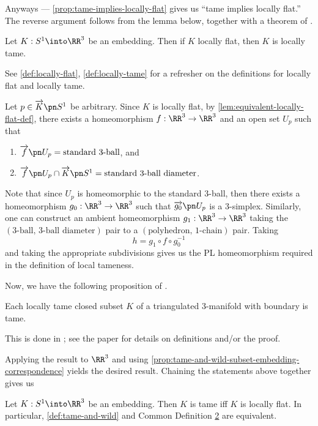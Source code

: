 Anyways --- \cref{prop:tame-implies-locally-flat} gives us ``tame
implies locally flat.'' The reverse argument follows from the lemma
below, together with a theorem of \cite{Bing}.
\begin{lemma}
  Let $K : S^1 \into \RR^3$ be an embedding. Then if $K$ locally flat,
  then $K$ is locally tame.
\end{lemma}
See \cref{def:locally-flat}, \cref{def:locally-tame} for a refresher
on the definitions for locally flat and locally tame.
\begin{sproof}
  Let $p \in \fim{K}{S^1}$ be arbitrary. Since $K$ is locally flat, by
  \cref{lem:equivalent-locally-flat-def}, there exists a homeomorphism
  $f : \RR^3 \to \RR^3$ and an open set $U_p$ such that
  \begin{enumerate}[label=\arabic*)]
    \item $\fim{f}{U_p} = \text{standard 3-ball}$, and
    \item $\fim{f}{U_p \cap \fim{K}{S^1}} = \text{standard 3-ball diameter}$.
  \end{enumerate}
  Note that since $U_p$ is homeomorphic to the standard $3$-ball, then
  there exists a homeomorphism $g_0 : \RR^3 \to \RR^3$ such that
  $\fim{g_0}{U_p}$ is a $3$-simplex. Similarly, one can construct an
  ambient homeomorphism $g_1 : \RR^3 \to \RR^3$ taking the
  $(\text{3-ball, 3-ball diameter})$ pair to a $(\text{polyhedron,
    $1$-chain})$ pair. Taking
  \[
    h = g_1 \circ f \circ g_0^{-1}
  \]
  and taking the appropriate subdivisions gives us the PL
  homeomorphism required in the definition of local tameness.
\end{sproof}
Now, we have the following proposition of \cite{Bing}.
\begin{theorem}
  Each locally tame closed subset $K$ of a triangulated 3-manifold
  with boundary is tame.
\end{theorem}
\begin{sproof}
  This is done in \cite{Bing}; see the paper for details on
  definitions and/or the proof.
\end{sproof}
Applying the result to $\RR^3$ and using
\cref{prop:tame-and-wild-subset-embedding-correspondence} yields the
desired result. Chaining the statements above together gives us
\begin{corollary}
  Let $K : S^1 \into \RR^3$ be an embedding. Then $K$ is tame iff $K$
  is locally flat. In particular, \cref{def:tame-and-wild} and Common
  Definition \hyperlink{def:cdef2b}{2} are equivalent.
\end{corollary}


